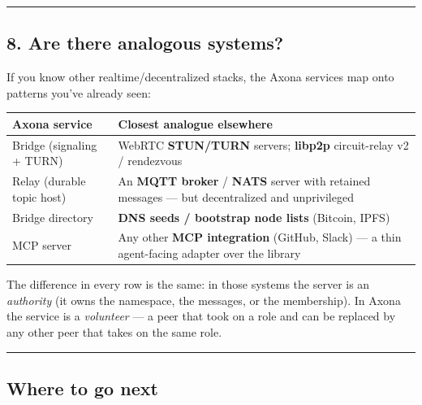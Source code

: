 \documentclass[
  nobib]{tufte-handout}
\newcounter{none} %
\begin{document}
\begin{center}\rule{0.5\linewidth}{0.5pt}\end{center}

\subsection{8. Are there analogous
systems?}\label{are-there-analogous-systems}

If you know other realtime/decentralized stacks, the Axona services map
onto patterns you've already seen:

{\def\LTcaptype{none} %
\begin{longtable}[]{@{}
  >{\raggedright\arraybackslash}p{}
  >{\raggedright\arraybackslash}p{}@{}}
\toprule\noalign{}
\begin{minipage}[b]{\linewidth}\raggedright
Axona service
\end{minipage} & \begin{minipage}[b]{\linewidth}\raggedright
Closest analogue elsewhere
\end{minipage} \\
\midrule\noalign{}
\endhead
\bottomrule\noalign{}
\endlastfoot
Bridge (signaling + TURN) & WebRTC \textbf{STUN/TURN} servers;
\textbf{libp2p} circuit-relay v2 / rendezvous \\
Relay (durable topic host) & An \textbf{MQTT broker} / \textbf{NATS}
server with retained messages --- but decentralized and unprivileged \\
Bridge directory & \textbf{DNS seeds / bootstrap node lists} (Bitcoin,
IPFS) \\
MCP server & Any other \textbf{MCP integration} (GitHub, Slack) --- a
thin agent-facing adapter over the library \\
\end{longtable}
}

The difference in every row is the same: in those systems the server is
an \emph{authority} (it owns the namespace, the messages, or the
membership). In Axona the service is a \emph{volunteer} --- a peer that
took on a role and can be replaced by any other peer that takes on the
same role.

\begin{center}\rule{0.5\linewidth}{0.5pt}\end{center}

\subsection{Where to go next}\label{where-to-go-next}
\end{document}
